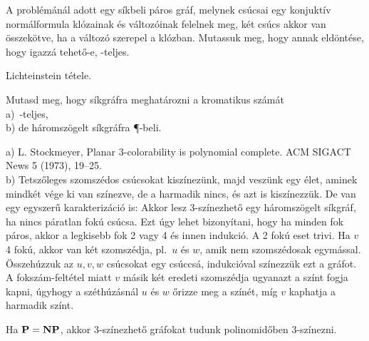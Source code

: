 \begin{Exercise}[counter={sorszam}, difficulty=1]
	A  problémánál adott egy s\'ikbeli páros gráf, melynek csúcsai egy konjuktív normál\-for\-mu\-la klózainak és változóinak felelnek meg, két csúcs akkor van összekötve, ha a változó szerepel a klózban. Mutassuk meg, hogy annak eldöntése, hogy igazz\'a tehet\H o-e, \NP-teljes.
\end{Exercise}	
\begin{Answer}
	Lichteinstein t\'etele.
\end{Answer}



\begin{Exercise}[counter={sorszam}, difficulty=0]
	Mutasd meg, hogy s\'ikgr\'afra  meghat\'arozni a kromatikus sz\'am\'at\\
	a)~\hard \NP-teljes,\\
	b) de h\'aromsz\"ogelt s\'ikgr\'afra \P-beli.
\end{Exercise}	
\begin{Answer}
	a)  L. Stockmeyer, Planar 3-colorability is polynomial complete. ACM SIGACT News 5 (1973),
	19--25.\\
	b) Tetsz\H oleges szomsz\'edos cs\'ucsokat kisz\'inez\"unk, majd vesz\"unk egy \'elet, aminek mindk\'et v\'ege ki van sz\'inezve, de a harmadik nincs, \'es azt is kisz\'inezz\"uk.
	De van egy egyszer\H u karakteriz\'aci\'o is: Akkor lesz 3-sz\'inezhet\H o egy h\'aromsz\"ogelt s\'ikgr\'af, ha nincs p\'aratlan fok\'u cs\'ucsa. Ezt \'ugy lehet bizony\'itani, hogy ha minden fok p\'aros, akkor a legkisebb fok 2 vagy 4 \'es innen indukci\'o. A 2 fok\'u eset trivi. Ha $v$ 4 fok\'u, akkor van k\'et szomsz\'edja, pl.\ $u$ \'es $w$, amik nem szomsz\'edosak egym\'assal. \"Osszeh\'uzzuk az $u,v,w$ cs\'ucsokat egy cs\'uccs\'a, indukci\'oval sz\'inezz\"uk ezt a gr\'afot. A foksz\'am-felt\'etel miatt $v$ m\'asik k\'et eredeti szomsz\'edja ugyanazt a sz\'int fogja kapni, \'ugyhogy a sz\'eth\'uz\'asn\'al $u$ \'es $w$ \H orizze meg a sz\'in\'et, m\'ig $v$ kaphatja a harmadik sz\'int.
\end{Answer}

\begin{Exercise}[counter={sorszam}, difficulty=0]
	Ha $\mbox{\ensuremath{\mathbf{P}}}=\mbox{\ensuremath{\mathbf{NP}}}$, akkor 3-színezhető gráfokat tudunk polinomidőben 3-színezni.
\end{Exercise}




